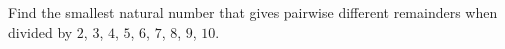 \problem
Find the smallest natural number that gives pairwise different remainders when
divided by $2$, $3$, $4$, $5$, $6$, $7$, $8$, $9$, $10$.
\solution
\endproblem
